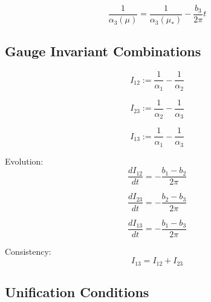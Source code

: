 \documentclass[11pt,a4paper]{article}
\theoremstyle{definition}
\begin{document}
\begin{equation}
\label{eq:alpha_sol_3}
\frac{1}{\alpha_3(\mu)} = \frac{1}{\alpha_3(\mu_*)} - \frac{b_3}{2\pi}t
\end{equation}

\subsection{Gauge Invariant Combinations}
\label{subsec:gauge_inv}

\begin{equation}
\label{eq:I12_def}
I_{12} := \frac{1}{\alpha_1} - \frac{1}{\alpha_2}
\end{equation}

\begin{equation}
\label{eq:I23_def}
I_{23} := \frac{1}{\alpha_2} - \frac{1}{\alpha_3}
\end{equation}

\begin{equation}
\label{eq:I13_def}
I_{13} := \frac{1}{\alpha_1} - \frac{1}{\alpha_3}
\end{equation}

Evolution:
\begin{equation}
\label{eq:I12_evol}
\frac{dI_{12}}{dt} = -\frac{b_1 - b_2}{2\pi}
\end{equation}

\begin{equation}
\label{eq:I23_evol}
\frac{dI_{23}}{dt} = -\frac{b_2 - b_3}{2\pi}
\end{equation}

\begin{equation}
\label{eq:I13_evol}
\frac{dI_{13}}{dt} = -\frac{b_1 - b_3}{2\pi}
\end{equation}

Consistency:
\begin{equation}
\label{eq:I_consistency}
I_{13} = I_{12} + I_{23}
\end{equation}

\subsection{Unification Conditions}
\label{subsec:unification}
\end{document}
